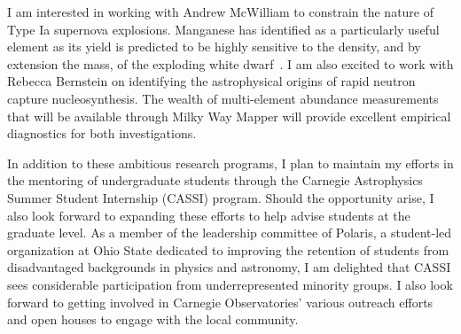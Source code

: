\documentclass[main.tex]{subfiles}
\begin{document}
I am interested in working with Andrew McWilliam to constrain the nature of
Type Ia supernova explosions.
Manganese has identified as a particularly useful element as its yield is
predicted to be highly sensitive to the density, and by extension the mass,
of the exploding white dwarf~\citep[e.g.,][]{delosReyes2020}.
I am also excited to work with Rebecca Bernstein on identifying the
astrophysical origins of rapid neutron capture nucleosynthesis.
The wealth of multi-element abundance measurements that will be available
through Milky Way Mapper will provide excellent empirical diagnostics for both
investigations.
\par
In addition to these ambitious research programs, I plan to maintain my efforts
in the mentoring of undergraduate students through the Carnegie Astrophysics
Summer Student Internship (CASSI) program.
Should the opportunity arise, I also look forward to expanding these efforts
to help advise students at the graduate level.
As a member of the leadership committee of Polaris, a student-led organization
at Ohio State dedicated to improving the retention of students from
disadvantaged backgrounds in physics and astronomy, I am delighted that CASSI
sees considerable participation from underrepresented minority groups.
I also look forward to getting involved in Carnegie Observatories' various
outreach efforts and open houses to engage with the local community.
\end{document}
